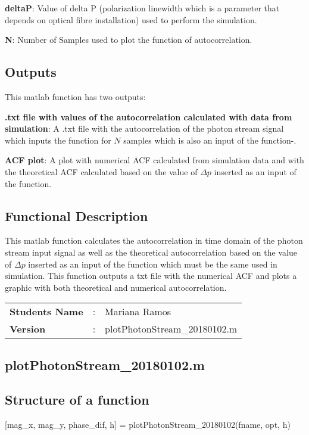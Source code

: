 \textbf{deltaP}: Value of delta P (polarization linewidth which is a parameter that depends on optical fibre installation) used to perform the simulation.
\bigskip

\textbf{N}: Number of Samples used to plot the function of autocorrelation.


\subsection*{Outputs}
This matlab function has two outputs:
\bigskip

\textbf{.txt file with values of the autocorrelation calculated with data from simulation}: A .txt file with the autocorrelation of the photon stream signal which inputs the function for $N$ samples which is also an input of the function-.
\bigskip

\textbf{ACF plot}: A plot with numerical ACF calculated from simulation data and with the theoretical ACF calculated based on the value of $\Delta p$ inserted as an input of the function.


\subsection*{Functional Description}
This matlab function calculates the autocorrelation in time domain of the photon stream input signal as well as the theoretical autocorrelation based on the value of $\Delta p$ inserted as an input of the function which must be the same used in simulation. This function outputs a txt file with the numerical ACF and plots a graphic with both theoretical and numerical autocorrelation.

\begin{tcolorbox}	
	\begin{tabular}{p{2.75cm} p{0.2cm} p{10.5cm}} 	
		\textbf{Students Name}  &:& Mariana Ramos\\
		\textbf{Version}      &:& plotPhotonStream\_20180102.m
	\end{tabular}
\end{tcolorbox}
\subsection{plotPhotonStream\_20180102.m}

\subsection*{Structure of a function}
[mag\_x, mag\_y, phase\_dif, h] = plotPhotonStream\_20180102(fname, opt, h)

